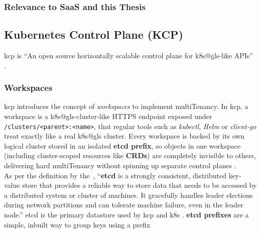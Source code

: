 \documentclass[11pt, a4paper, oneside, listof=totoc]{scrartcl}
\begin{document}
            \subsubsection{Relevance to SaaS and this Thesis}

        \newpage

        \subsection{Kubernetes Control Plane (KCP)}\label{subsec:kcp}
            \gls{kcp} is \enquote{An open source horizontally scalable control plane for
            \gls{k8s@gls}-like APIs} \parencite{kcpio}.

            \subsubsection{Workspaces}\label{subsubsec:workspaces}
                \gls{kcp} introduces the concept of \textit{workspaces} to implement
                \gls{multiTenancy}.
                In \gls{kcp}, a workspace is a \gls{k8s@gls}-cluster-like HTTPS endpoint exposed
                under \texttt{/clusters/<parent>:<name>}, that regular tools such as
                \textit{kubectl}, \textit{Helm} or \textit{client-go} treat exactly like a real
                \gls{k8s@gls} cluster.
                Every workspace is backed by its own logical cluster stored in an isolated
                \textbf{\gls{etcd} prefix}, so objects in one workspace (including cluster-scoped
                resources like \textbf{CRDs}) are completely invisible to others, delivering hard
                \gls{multiTenancy} without spinning up separate control planes
                \parencite{kcpWorkspaces}.
                \\
                As per the definition by the~\cite{etcd}, \enquote{\textbf{\gls{etcd}} is a strongly
                consistent, distributed key-value store that provides a reliable way to store data
                that needs to be accessed by a distributed system or cluster of machines.
                It gracefully handles leader elections during network partitions and can tolerate
                machine failure, even in the leader node.}
                \gls{etcd} is the primary datastore used by \gls{kcp} and \gls{k8s}
                \parencites{kcpDevStorageToRest}[p.~214]{sun2021}.
                \textbf{\gls{etcd} prefixes} are a simple, inbuilt way to group keys using a prefix
\end{document}
